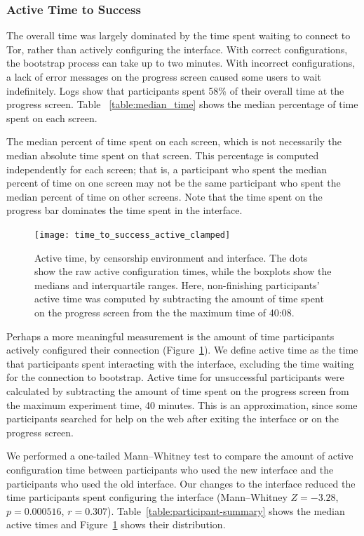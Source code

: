\documentclass[USenglish,oneside,twocolumn]{article}
\begin{document}
{\subsubsection{Active Time to Success} 
The overall time was largely dominated by the time spent waiting to connect to Tor, rather than actively configuring the interface. With correct configurations, the bootstrap process can take up to two minutes.  With incorrect configurations, a lack of error messages on the progress screen caused some users to wait indefinitely.  Logs show that participants spent 58\% of their overall time at the progress screen. Table ~\ref{table:median_time} shows the median percentage of time spent on each screen. 

\begin{table}[t]
\centering

\caption{The median percent of time spent on each screen, which is not
necessarily the median absolute time spent on that screen. 
This percentage is computed independently for each screen; that is, a participant who spent the median percent 
of time on one screen may not be the same participant who spent the median percent
of time on other screens. Note that the time spent on the progress bar dominates the 
time spent in the interface.} 
\label{table:median_time}
\end{table}

\begin{figure}[t]
\centering
\texttt{[image: time\_to\_success\_active\_clamped]}
\caption{
Active time, by censorship environment and interface.
The dots show the raw active configuration times,
while the boxplots show the medians and interquartile ranges.
Here, non-finishing participants' active time was computed by
subtracting the amount of time spent on the progress screen from the 
the maximum time of 40:08.
}
\label{fig:time_to_success_active_clamped}
\end{figure}

Perhaps a more meaningful measurement is the amount of time participants actively configured their connection (Figure~\ref{fig:time_to_success_active_clamped}). We define active time as the time that participants spent interacting with the interface, excluding the time waiting for the connection to bootstrap. Active time for unsuccessful participants were calculated by subtracting the amount of time spent on the progress screen from the maximum experiment time, 40 minutes. This is an approximation, since some participants searched for help on the web after exiting the interface or on the progress screen. 

We performed a one-tailed Mann--Whitney test to compare the amount of active configuration time between participants who used the new interface and the participants who used the old interface. Our changes to the interface reduced the time participants spent configuring the interface (Mann--Whitney $Z = -3.28$, $p = 0.000516$, $r = 0.307$).  Table~\ref{table:participant-summary} shows the median active times and Figure~\ref{fig:time_to_success_active_clamped} shows their distribution.
}
\end{document}
